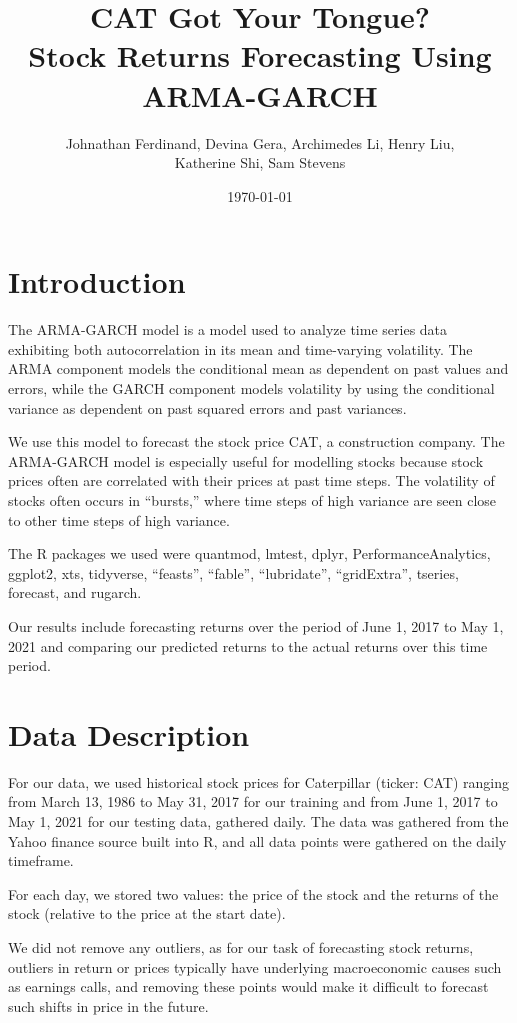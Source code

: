 \documentclass{article}
\title {CAT Got Your Tongue? \\
\large Stock Returns Forecasting Using ARMA-GARCH}
\author{Johnathan Ferdinand, Devina Gera, Archimedes Li, Henry Liu, \\Katherine Shi, Sam Stevens}
\date{\today}
\begin{document}
\maketitle

\section{Introduction}
The ARMA-GARCH model is a model used to analyze time series data exhibiting both autocorrelation in its mean and time-varying volatility.  The ARMA component models the conditional mean as dependent on past values and errors, while the GARCH component models volatility by using the conditional variance as dependent on past squared errors and past variances.

\noindent We use this model to forecast the stock price CAT, a construction company.  The ARMA-GARCH model is especially useful for modelling stocks because stock prices often are correlated with their prices at past time steps.  The volatility of stocks often occurs in “bursts,” where time steps of high variance are seen close to other time steps of high variance.

\noindent The R packages we used were quantmod, lmtest, dplyr, PerformanceAnalytics, ggplot2, xts, tidyverse, “feasts”, “fable”, “lubridate”, “gridExtra”, tseries, forecast, and rugarch. 

\noindent Our results include forecasting returns over the period of June 1, 2017 to May 1, 2021 and comparing our predicted returns to the actual returns over this time period. 

\section{Data Description}
\noindent For our data, we used historical stock prices for Caterpillar (ticker: CAT) ranging from March 13, 1986 to May 31, 2017 for our training and from June 1, 2017 to May 1, 2021 for our testing data, gathered daily. The data was gathered from the Yahoo finance source built into R, and all data points were gathered on the daily timeframe. 

\noindent For each day, we stored two values: the price of the stock and the returns of the stock (relative to the price at the start date).

\noindent We did not remove any outliers, as for our task of forecasting stock returns, outliers in return or prices typically have underlying macroeconomic causes such as earnings calls, and removing these points would make it difficult to forecast such shifts in price in the future.
\end{document}
